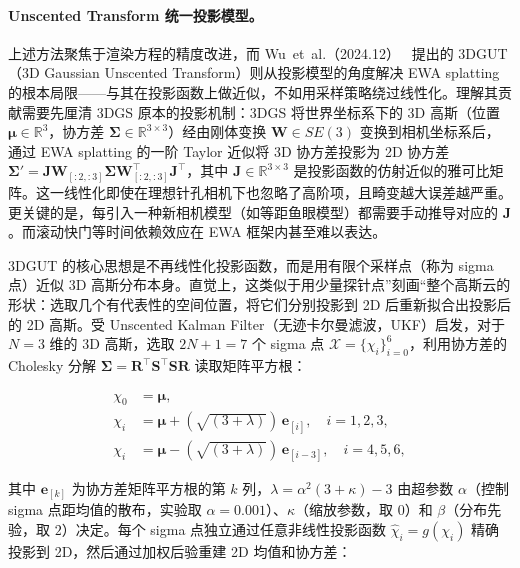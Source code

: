 \paragraph{Unscented Transform 统一投影模型。}

上述方法聚焦于渲染方程的精度改进，而 Wu~et~al.（2024.12）~\cite{2412_12507} 提出的 3DGUT（3D Gaussian Unscented Transform）则从投影模型的角度解决 EWA splatting 的根本局限——与其在投影函数上做近似，不如用采样策略绕过线性化。理解其贡献需要先厘清 3DGS 原本的投影机制：3DGS 将世界坐标系下的 3D 高斯（位置 $\boldsymbol{\mu} \in \mathbb{R}^3$，协方差 $\boldsymbol{\Sigma} \in \mathbb{R}^{3 \times 3}$）经由刚体变换 $\boldsymbol{W} \in SE(3)$ 变换到相机坐标系后，通过 EWA splatting 的一阶 Taylor 近似将 3D 协方差投影为 2D 协方差 $\boldsymbol{\Sigma}' = \boldsymbol{J}\boldsymbol{W}_{[:2,:3]}\boldsymbol{\Sigma}\boldsymbol{W}_{[:2,:3]}^\top\boldsymbol{J}^\top$，其中 $\boldsymbol{J} \in \mathbb{R}^{3 \times 3}$ 是投影函数的仿射近似的雅可比矩阵。这一线性化即使在理想针孔相机下也忽略了高阶项，且畸变越大误差越严重。更关键的是，每引入一种新相机模型（如等距鱼眼模型）都需要手动推导对应的 $\boldsymbol{J}$。而滚动快门等时间依赖效应在 EWA 框架内甚至难以表达。

3DGUT 的核心思想是不再线性化投影函数，而是用有限个采样点（称为 sigma 点）近似 3D 高斯分布本身。直觉上，这类似于用少量探针点”刻画“整个高斯云的形状：选取几个有代表性的空间位置，将它们分别投影到 2D 后重新拟合出投影后的 2D 高斯。受 Unscented Kalman Filter（无迹卡尔曼滤波，UKF）启发，对于 $N=3$ 维的 3D 高斯，选取 $2N+1=7$ 个 sigma 点 $\mathcal{X} = \{\chi_i\}_{i=0}^{6}$，利用协方差的 Cholesky 分解 $\boldsymbol{\Sigma} = \boldsymbol{R}^\top\boldsymbol{S}^\top\boldsymbol{S}\boldsymbol{R}$ 读取矩阵平方根：

\begin{align*}
\chi_0 &= \boldsymbol{\mu}, \\
\chi_i &= \boldsymbol{\mu} + (\sqrt{(3+\lambda)})\,\boldsymbol{e}_{[i]}, \quad i=1,2,3, \\
\chi_i &= \boldsymbol{\mu} - (\sqrt{(3+\lambda)})\,\boldsymbol{e}_{[i-3]}, \quad i=4,5,6,
\end{align*}

其中 $\boldsymbol{e}_{[k]}$ 为协方差矩阵平方根的第 $k$ 列，$\lambda = \alpha^2(3+\kappa)-3$ 由超参数 $\alpha$（控制 sigma 点距均值的散布，实验取 $\alpha=0.001$）、$\kappa$（缩放参数，取 $0$）和 $\beta$（分布先验，取 $2$）决定。每个 sigma 点独立通过任意非线性投影函数 $\hat{\chi}_i = g(\chi_i)$ 精确投影到 2D，然后通过加权后验重建 2D 均值和协方差：


